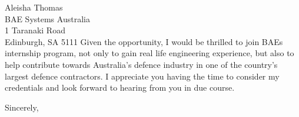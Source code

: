 \documentclass[
    backaddress=false,
    foldmarks=false,
    fromalign=right,
    fromrule,
    fromphone,
    fromemail,
    parskip=half,
    refline=nodate
]{scrlttr2}
\begin{document}
\begin{letter}{%
        Aleisha Thomas        \\
        BAE Systems Australia \\
        1 Taranaki Road       \\
        Edinburgh, SA 5111}
        Given the opportunity, I would be thrilled to join BAEs internship program, not only to gain real life engineering experience, but also to help contribute towards Australia's defence industry in one of the country's largest defence contractors. I appreciate you having the time to consider my credentials and look forward to hearing from you in due course.

        \closing{Sincerely,}
    \end{letter}
\end{document}

